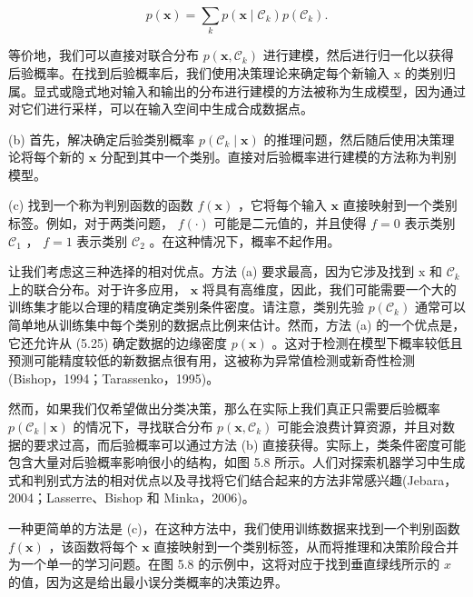 \documentclass[10pt]{report}
\begin{document}
\[
p\left( \mathbf{x}\right)  = \mathop{\sum }\limits_{k}p\left( {\mathbf{x} \mid  {\mathcal{C}}_{k}}\right) p\left( {\mathcal{C}}_{k}\right) . \tag{5.25}
\]

等价地，我们可以直接对联合分布 \(p\left( {\mathbf{x},{\mathcal{C}}_{k}}\right)\) 进行建模，然后进行归一化以获得后验概率。在找到后验概率后，我们使用决策理论来确定每个新输入 \(\mathrm{x}\) 的类别归属。显式或隐式地对输入和输出的分布进行建模的方法被称为生成模型，因为通过对它们进行采样，可以在输入空间中生成合成数据点。

(b) 首先，解决确定后验类别概率 \(p\left( {{\mathcal{C}}_{k} \mid  \mathbf{x}}\right)\) 的推理问题，然后随后使用决策理论将每个新的 \(\mathbf{x}\) 分配到其中一个类别。直接对后验概率进行建模的方法称为判别模型。

(c) 找到一个称为判别函数的函数 \(f\left( \mathbf{x}\right)\) ，它将每个输入 \(\mathbf{x}\) 直接映射到一个类别标签。例如，对于两类问题， \(f\left( \cdot \right)\) 可能是二元值的，并且使得 \(f = 0\) 表示类别 \({\mathcal{C}}_{1}\) ， \(f = 1\) 表示类别 \({\mathcal{C}}_{2}\) 。在这种情况下，概率不起作用。

让我们考虑这三种选择的相对优点。方法 (a) 要求最高，因为它涉及找到 \(\mathrm{x}\) 和 \({\mathcal{C}}_{k}\) 上的联合分布。对于许多应用， \(\mathbf{x}\) 将具有高维度，因此，我们可能需要一个大的训练集才能以合理的精度确定类别条件密度。请注意，类别先验 \(p\left( {\mathcal{C}}_{k}\right)\) 通常可以简单地从训练集中每个类别的数据点比例来估计。然而，方法 (a) 的一个优点是，它还允许从 (5.25) 确定数据的边缘密度 \(p\left( \mathbf{x}\right)\) 。这对于检测在模型下概率较低且预测可能精度较低的新数据点很有用，这被称为异常值检测或新奇性检测(Bishop，1994；Tarassenko，1995)。

然而，如果我们仅希望做出分类决策，那么在实际上我们真正只需要后验概率 \(p\left( {{\mathcal{C}}_{k} \mid  \mathbf{x}}\right)\) 的情况下，寻找联合分布 \(p\left( {\mathbf{x},{\mathcal{C}}_{k}}\right)\) 可能会浪费计算资源，并且对数据的要求过高，而后验概率可以通过方法 (b) 直接获得。实际上，类条件密度可能包含大量对后验概率影响很小的结构，如图 5.8 所示。人们对探索机器学习中生成式和判别式方法的相对优点以及寻找将它们结合起来的方法非常感兴趣(Jebara，2004；Lasserre、Bishop 和 Minka，2006)。

一种更简单的方法是 (c)，在这种方法中，我们使用训练数据来找到一个判别函数 \(f\left( \mathbf{x}\right)\) ，该函数将每个 \(\mathbf{x}\) 直接映射到一个类别标签，从而将推理和决策阶段合并为一个单一的学习问题。在图 5.8 的示例中，这将对应于找到垂直绿线所示的 \(x\) 的值，因为这是给出最小误分类概率的决策边界。
\end{document}
